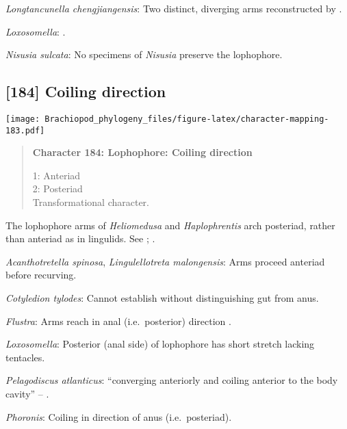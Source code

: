 \documentclass[openany]{book}
\theoremstyle{definition}
\theoremstyle{definition}
\theoremstyle{definition}
\theoremstyle{remark}
\begin{document}
\hypertarget{Longtancunella_chengjiangensis-coding-183}{}
\emph{Longtancunella chengjiangensis}: Two distinct, diverging arms
reconstructed by \citet{Zhang2007Agregarious}.

\hypertarget{Loxosomella-coding-183}{}
\emph{Loxosomella}: \citet{Nielsen1966}.

\hypertarget{Nisusia_sulcata-coding-183}{}
\emph{Nisusia sulcata}: No specimens of \emph{Nisusia} preserve the
lophophore.

\subsection*{{[}184{]} Coiling direction}\label{coiling-direction}

\texttt{[image: Brachiopod\_phylogeny\_files/figure-latex/character-mapping-183.pdf]}

\begin{quote}
\textbf{Character 184: Lophophore: Coiling direction}

1: Anteriad\\
2: Posteriad\\
Transformational character.
\end{quote}

The lophophore arms of \emph{Heliomedusa} and \emph{Haplophrentis} arch
posteriad, rather than anteriad as in lingulids. See
\citet{Zhang2009Architectureand}; \citet{Moysiuk2017Hyolithsare}.

\hypertarget{Acanthotretella_spinosa-coding-184}{}
\emph{Acanthotretella spinosa}, \emph{Lingulellotreta malongensis}: Arms
proceed anteriad before recurving.

\hypertarget{Cotyledion_tylodes-coding-184}{}
\emph{Cotyledion tylodes}: Cannot establish without distinguishing gut
from anus.

\hypertarget{Flustra-coding-184}{}
\emph{Flustra}: Arms reach in anal (i.e.~posterior) direction
\citep{Shunkina2015}.

\hypertarget{Loxosomella-coding-184}{}
\emph{Loxosomella}: Posterior (anal side) of lophophore has short
stretch lacking tentacles.

\hypertarget{Pelagodiscus_atlanticus-coding-184}{}
\emph{Pelagodiscus atlanticus}: ``converging anteriorly and coiling
anterior to the body cavity'' -- \citet{Zhang2009Architectureand}.

\hypertarget{Phoronis-coding-184}{}
\emph{Phoronis}: Coiling in direction of anus (i.e.~posteriad).
\end{document}
